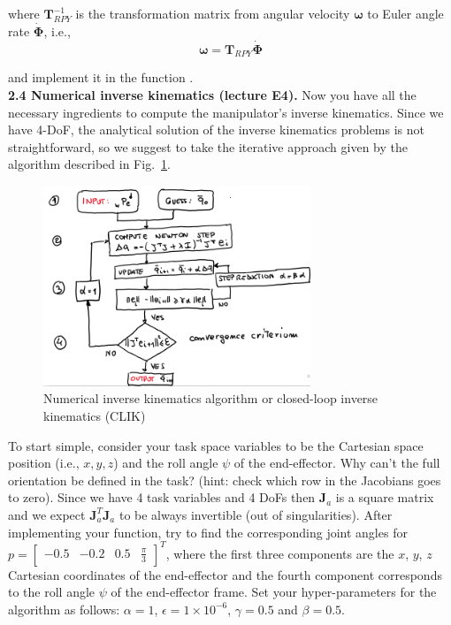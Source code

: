 \documentclass[11pt]{article}
\newcommand{\mat}[1]{\ensuremath{\begin{bmatrix}#1\end{bmatrix}}}	%
\begin{document}
where $\mathbf{T}_{RPY}^{-1}$ is the transformation matrix from angular velocity $\boldsymbol{\omega}$ to Euler angle rate $\dot{\mathbf{\Phi}}$, i.e.,
\begin{equation*}
	\boldsymbol{\omega} = \mathbf{T}_{RPY} \dot{\mathbf{\Phi}}
\end{equation*}

and implement it in the function .\\




\textbf{2.4 Numerical inverse kinematics (lecture E4).} Now you have all the necessary ingredients to compute the manipulator's inverse kinematics. Since we have 4-DoF, the analytical solution of the inverse kinematics problems is not straightforward, so we suggest to take the iterative approach given by the algorithm described in Fig.~\ref{fig:CLIK}.  
%
\begin{figure}[bht]
	\centering
	\includegraphics[width=8cm]{pics/flow_chart.png}
	\caption{Numerical inverse kinematics algorithm or closed-loop inverse kinematics (CLIK)}
	\label{fig:CLIK}
\end{figure}
%
To start simple, consider your task space variables to be the Cartesian space position (i.e., $x,y,z$) and the roll angle $\psi$ of the end-effector. 
Why can't the full orientation be defined in the task? (hint: check which row in the Jacobians goes to zero).
Since we have 4 task variables and 4 DoFs then   $\mathbf{J}_a$ is a square matrix and we expect $\mathbf{J}_a^T\mathbf{J}_a$ to be always invertible (out of singularities).  After implementing your function, try to find the corresponding joint angles for $p = \mat{-0.5 & -0.2 & 0.5 & \frac{\pi}{3}}^T$, where the first three components are the $x$, $y$, $z$ Cartesian coordinates of the end-effector and the fourth component corresponds to the roll angle $\psi$ of the end-effector frame. Set your hyper-parameters for the algorithm as follows: $\alpha = 1$, $\epsilon = 1 \times 10^{-6}$, $\gamma = 0.5$ and $\beta = 0.5$. 
\end{document}
